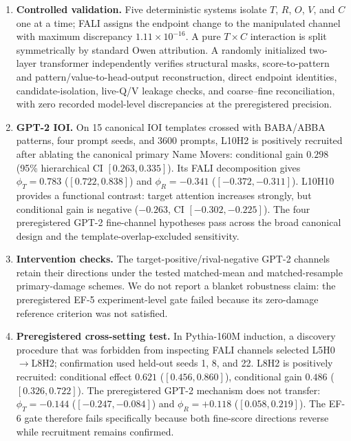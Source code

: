 \documentclass[11pt]{article}
\begin{document}
\begin{enumerate}
\item \textbf{Controlled validation.} Five deterministic systems isolate $T$, $R$, $O$, $V$, and $C$ one at a time; FALI assigns the endpoint change to the manipulated channel with maximum discrepancy $1.11\times10^{-16}$. A pure $T\times C$ interaction is split symmetrically by standard Owen attribution. A randomly initialized two-layer transformer independently verifies structural masks, score-to-pattern and pattern/value-to-head-output reconstruction, direct endpoint identities, candidate-isolation, live-Q/V leakage checks, and coarse--fine reconciliation, with zero recorded model-level discrepancies at the preregistered precision.

\item \textbf{GPT-2 IOI.} On 15 canonical IOI templates crossed with BABA/ABBA patterns, four prompt seeds, and 3600 prompts, L10H2 is positively recruited after ablating the canonical primary Name Movers: conditional gain $0.298$ (95\% hierarchical CI $[0.263,0.335]$). Its FALI decomposition gives $\phi_T=0.783$ ($[0.722,0.838]$) and $\phi_R=-0.341$ ($[-0.372,-0.311]$). L10H10 provides a functional contrast: target attention increases strongly, but conditional gain is negative ($-0.263$, CI $[-0.302,-0.225]$). The four preregistered GPT-2 fine-channel hypotheses pass across the broad canonical design and the template-overlap-excluded sensitivity.

\item \textbf{Intervention checks.} The target-positive/rival-negative GPT-2 channels retain their directions under the tested matched-mean and matched-resample primary-damage schemes. We do not report a blanket robustness claim: the preregistered EF-5 experiment-level gate failed because its zero-damage reference criterion was not satisfied.

\item \textbf{Preregistered cross-setting test.} In Pythia-160M induction, a discovery procedure that was forbidden from inspecting FALI channels selected L5H0$\rightarrow$L8H2; confirmation used held-out seeds 1, 8, and 22. L8H2 is positively recruited: conditional effect $0.621$ ($[0.456,0.860]$), conditional gain $0.486$ ($[0.326,0.722]$). The preregistered GPT-2 mechanism does not transfer: $\phi_T=-0.144$ ($[-0.247,-0.084]$) and $\phi_R=+0.118$ ($[0.058,0.219]$). The EF-6 gate therefore fails specifically because both fine-score directions reverse while recruitment remains confirmed.
\end{enumerate}
\end{document}
